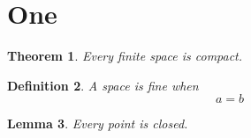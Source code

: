 \documentclass{article}
\newtheorem{theorem}{Theorem}[section]
\newtheorem{definition}[theorem]{Definition}
\newtheorem{lemma}[theorem]{Lemma}
\begin{document}
\section{One}
\begin{theorem}\label{thm:first} Every finite space is compact. \end{theorem}
\begin{definition}
A space is fine when
\begin{equation}
a = b
\end{equation}
\label{def:fine}
\end{definition}
\begin{lemma}\label{lem:last} Every point is closed. \end{lemma}
\end{document}
